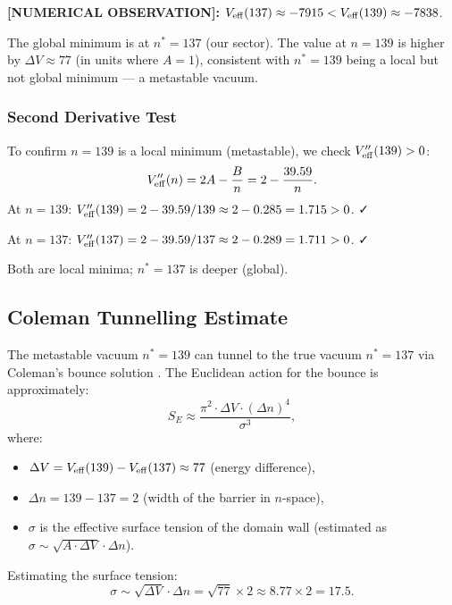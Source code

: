 \documentclass[12pt]{article}
\theoremstyle{definition}
\theoremstyle{remark}
\begin{document}
\begin{resultbox}
\textbf{[NUMERICAL OBSERVATION]:}
$V_{\rm eff}(137) \approx -7915 < V_{\rm eff}(139) \approx -7838$.

The global minimum is at $n^* = 137$ (our sector).
The value at $n = 139$ is higher by $\Delta V \approx 77$ (in units where $A=1$),
consistent with $n^* = 139$ being a local but not global minimum --- a metastable
vacuum.
\end{resultbox}

\subsubsection{Second Derivative Test}

To confirm $n = 139$ is a local minimum (metastable), we check $V_{\rm eff}''(139) > 0$:
\begin{equation}
  V_{\rm eff}''(n) = 2A - \frac{B}{n} = 2 - \frac{39.59}{n}.
\end{equation}
At $n = 139$: $V_{\rm eff}''(139) = 2 - 39.59/139 \approx 2 - 0.285 = 1.715 > 0$. ✓

At $n = 137$: $V_{\rm eff}''(137) = 2 - 39.59/137 \approx 2 - 0.289 = 1.711 > 0$. ✓

Both are local minima; $n^* = 137$ is deeper (global).

\subsection{Coleman Tunnelling Estimate}

The metastable vacuum $n^* = 139$ can tunnel to the true vacuum $n^* = 137$ via
Coleman's bounce solution \cite{Coleman1977}.  The Euclidean action for the bounce is
approximately:
\begin{equation}
  S_E \approx \frac{\pi^2 \cdot \Delta V \cdot (\Delta n)^4}{\sigma^3},
  \label{eq:coleman_action}
\end{equation}
where:
\begin{itemize}
  \item $\Delta V = V_{\rm eff}(139) - V_{\rm eff}(137) \approx 77$ (energy difference),
  \item $\Delta n = 139 - 137 = 2$ (width of the barrier in $n$-space),
  \item $\sigma$ is the effective surface tension of the domain wall
        (estimated as $\sigma \sim \sqrt{A \cdot \Delta V} \cdot \Delta n$).
\end{itemize}

Estimating the surface tension:
\begin{equation}
  \sigma \sim \sqrt{\Delta V} \cdot \Delta n = \sqrt{77} \times 2 \approx 8.77 \times 2 = 17.5.
\end{equation}
\end{document}
